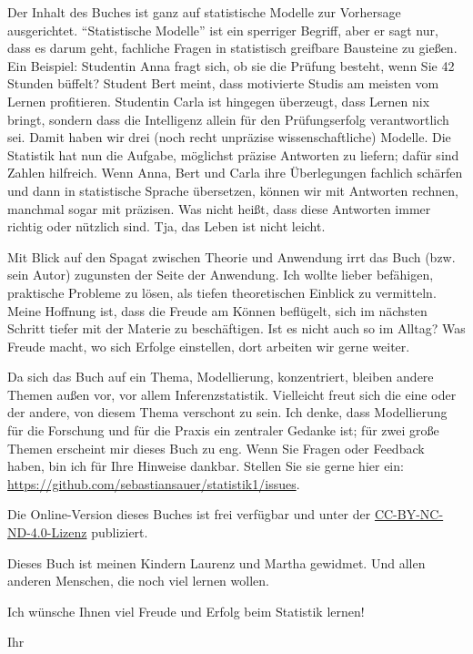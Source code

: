 \documentclass[
  letterpaper,
]{scrbook}
\theoremstyle{definition}
\theoremstyle{definition}
\theoremstyle{definition}
\theoremstyle{remark}
\begin{document}
Der Inhalt des Buches ist ganz auf statistische Modelle zur Vorhersage
ausgerichtet. \enquote{Statistische Modelle} ist ein sperriger Begriff,
aber er sagt nur, dass es darum geht, fachliche Fragen in statistisch
greifbare Bausteine zu gießen. Ein Beispiel: Studentin Anna fragt sich,
ob sie die Prüfung besteht, wenn Sie 42 Stunden büffelt? Student Bert
meint, dass motivierte Studis am meisten vom Lernen profitieren.
Studentin Carla ist hingegen überzeugt, dass Lernen nix bringt, sondern
dass die Intelligenz allein für den Prüfungserfolg verantwortlich sei.
Damit haben wir drei (noch recht unpräzise wissenschaftliche) Modelle.
Die Statistik hat nun die Aufgabe, möglichst präzise Antworten zu
liefern; dafür sind Zahlen hilfreich. Wenn Anna, Bert und Carla ihre
Überlegungen fachlich schärfen und dann in statistische Sprache
übersetzen, können wir mit Antworten rechnen, manchmal sogar mit
präzisen. Was nicht heißt, dass diese Antworten immer richtig oder
nützlich sind. Tja, das Leben ist nicht leicht.

Mit Blick auf den Spagat zwischen Theorie und Anwendung irrt das Buch
(bzw. sein Autor) zugunsten der Seite der Anwendung. Ich wollte lieber
befähigen, praktische Probleme zu lösen, als tiefen theoretischen
Einblick zu vermitteln. Meine Hoffnung ist, dass die Freude am Können
beflügelt, sich im nächsten Schritt tiefer mit der Materie zu
beschäftigen. Ist es nicht auch so im Alltag? Was Freude macht, wo sich
Erfolge einstellen, dort arbeiten wir gerne weiter.

Da sich das Buch auf ein Thema, Modellierung, konzentriert, bleiben
andere Themen außen vor, vor allem Inferenzstatistik. Vielleicht freut
sich die eine oder der andere, von diesem Thema verschont zu sein. Ich
denke, dass Modellierung für die Forschung und für die Praxis ein
zentraler Gedanke ist; für zwei große Themen erscheint mir dieses Buch
zu eng. Wenn Sie Fragen oder Feedback haben, bin ich für Ihre Hinweise
dankbar. Stellen Sie sie gerne hier ein:
\url{https://github.com/sebastiansauer/statistik1/issues}.

Die Online-Version dieses Buches ist frei verfügbar und unter der
\href{https://creativecommons.org/licenses/by-nc-nd/4.0/deed.de}{CC-BY-NC-ND-4.0-Lizenz}
publiziert.

Dieses Buch ist meinen Kindern Laurenz und Martha gewidmet. Und allen
anderen Menschen, die noch viel lernen wollen.

Ich wünsche Ihnen viel Freude und Erfolg beim Statistik lernen!

Ihr
\end{document}
